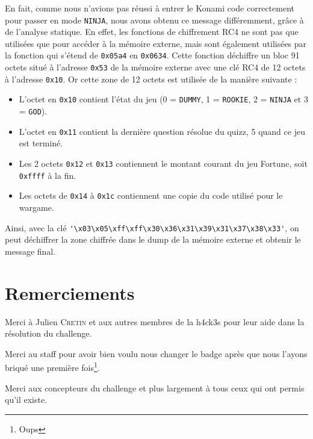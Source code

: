 \documentclass[11pt]{article}
\newcommand{\ttt}[1]{\texttt{#1}}
\begin{document}
    En fait, comme nous n'avions pas réussi à entrer le Konami code correctement pour passer en mode \ttt{NINJA}, nous avons obtenu ce message différemment, grâce à de l'analyse statique. En effet, les fonctions de chiffrement RC4 ne sont pas que utilisées que pour accéder à la mémoire externe, mais sont également utilisées par la fonction qui s'étend de \ttt{0x05a4} en \ttt{0x0634}. Cette fonction déchiffre un bloc 91 octets situé à l'adresse \ttt{0x53} de la mémoire externe avec une clé RC4 de 12 octets à l'adresse \ttt{0x10}.
    Or cette zone de 12 octets est utilisée de la manière suivante :
\begin{itemize}
  \item L'octet en \ttt{0x10} contient l'état du jeu (0 = \ttt{DUMMY}, 1 = \ttt{ROOKIE}, 2 = \ttt{NINJA} et 3 = \ttt{GOD}).
  \item L'octet en \ttt{0x11} contient la dernière question résolue du quizz, 5 quand ce jeu est terminé.
  \item Les 2 octets \ttt{0x12} et \ttt{0x13} contiennent le montant courant du jeu Fortune, soit \ttt{0xffff} à la fin.
  \item Les octets de \ttt{0x14} à \ttt{0x1c} contiennent une copie du code utilisé pour le wargame.
\end{itemize}

    Ainsi, avec la clé \verb|'\x03\x05\xff\xff\x30\x36\x31\x39\x31\x37\x38\x33'|, on peut déchiffrer la zone chiffrée dans le dump de la mémoire externe et obtenir le message final.

    \section*{Remerciements}
    Merci à Julien \textsc{Cretin} et aux autres membres de la h4ck3s pour leur aide dans la résolution du challenge.

    Merci au staff pour avoir bien voulu nous changer le badge après que nous l'ayons briqué une première fois\footnote{Oups}.

    Merci aux concepteurs du challenge et plus largement à tous ceux qui ont permis qu'il existe.
\end{document}
